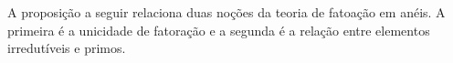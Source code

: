 %

A proposição a seguir relaciona duas noções da teoria de fatoação em anéis. A primeira é a unicidade de fatoração e a segunda é a relação entre elementos irredutíveis e primos.

